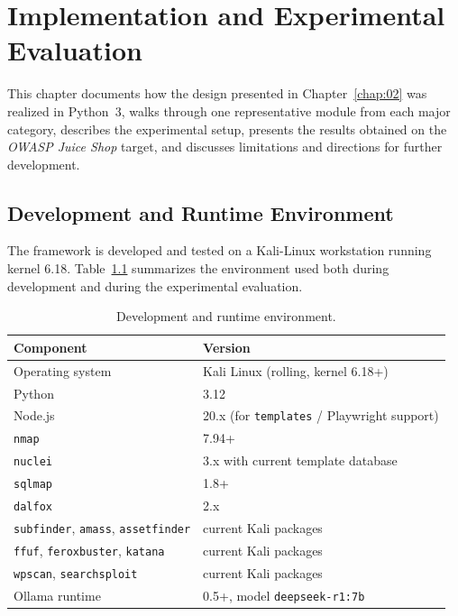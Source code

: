 \chapter[Implementation and Evaluation]{Implementation and Experimental Evaluation}
\label{chap:03}
\setlength{\parskip}{1em}

This chapter documents how the design presented in Chapter~\ref{chap:02} was realized in Python~3, walks through one representative module from each major category, describes the experimental setup, presents the results obtained on the \textit{OWASP Juice Shop} target, and discusses limitations and directions for further development.

\section{Development and Runtime Environment}

The framework is developed and tested on a Kali-Linux workstation running kernel 6.18. Table~\ref{tab:env} summarizes the environment used both during development and during the experimental evaluation.

\begin{table}[h]
\centering
\small
\begin{tabular}{|l|l|}
\hline
\textbf{Component} & \textbf{Version} \\
\hline
Operating system    & Kali Linux (rolling, kernel 6.18+) \\
Python              & 3.12 \\
Node.js             & 20.x (for \texttt{templates} / Playwright support) \\
\texttt{nmap}       & 7.94+ \\
\texttt{nuclei}     & 3.x with current template database \\
\texttt{sqlmap}     & 1.8+ \\
\texttt{dalfox}     & 2.x \\
\texttt{subfinder}, \texttt{amass}, \texttt{assetfinder} & current Kali packages \\
\texttt{ffuf}, \texttt{feroxbuster}, \texttt{katana}    & current Kali packages \\
\texttt{wpscan}, \texttt{searchsploit}                  & current Kali packages \\
Ollama runtime     & 0.5+, model \texttt{deepseek-r1:7b} \\
\hline
\end{tabular}
\caption{Development and runtime environment.}
\label{tab:env}
\end{table}

